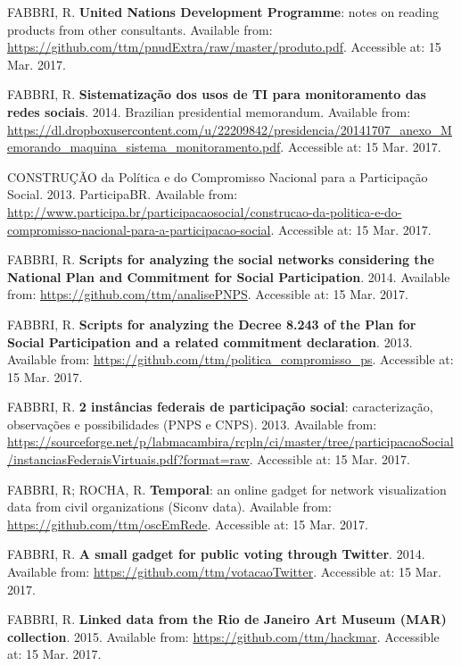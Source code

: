 \documentclass[
12pt,		%
openright,	%
twoside,  %
a4paper,			%
chapter=TITLE,		%
english,			%
french,				%
spanish,			%
brazil				%
]{USPSC}
\begin{document}
\begin{thebibliography}{999}
	FABBRI, R. \textbf{United Nations Development Programme}: notes on reading products from other consultants. Available from: \url{https://github.com/ttm/pnudExtra/raw/master/produto.pdf}. Accessible at: 15 Mar. 2017.

	FABBRI, R. \textbf{Sistematização dos usos de TI para monitoramento das redes sociais}. 2014. Brazilian presidential memorandum. Available from: \url{https://dl.dropboxusercontent.com/u/22209842/presidencia/20141707_anexo_Memorando_maquina_sistema_monitoramento.pdf}. Accessible at: 15 Mar. 2017.

	CONSTRUÇÃO da Política e do Compromisso Nacional para a Participação Social. 2013. ParticipaBR. Available from: \url{http://www.participa.br/participacaosocial/construcao-da-politica-e-do-compromisso-nacional-para-a-participacao-social}. Accessible at: 15 Mar. 2017.

	FABBRI, R. \textbf{Scripts for analyzing the social networks considering the National Plan and Commitment for Social Participation}. 2014. Available from: \url{https://github.com/ttm/analisePNPS}. Accessible at: 15 Mar. 2017.

	FABBRI, R. \textbf{Scripts for analyzing the Decree 8.243 of the Plan for Social Participation and a related commitment declaration}. 2013. Available from: \url{https://github.com/ttm/politica_compromisso_ps}. Accessible at: 15 Mar. 2017.

	FABBRI, R. \textbf{2 instâncias federais de participação social}: caracterização, observações e possibilidades (PNPS e CNPS). 2013. Available from: \url{https://sourceforge.net/p/labmacambira/rcpln/ci/master/tree/participacaoSocial/instanciasFederaisVirtuais.pdf?format=raw}. Accessible at: 15 Mar. 2017.

	FABBRI, R; ROCHA, R. \textbf{Temporal}: an online gadget for network visualization data from civil organizations (Siconv data). Available from: \url{https://github.com/ttm/oscEmRede}. Accessible at: 15 Mar. 2017.

	FABBRI, R. \textbf{A small gadget for public voting through Twitter}. 2014. Available from: \url{https://github.com/ttm/votacaoTwitter}. Accessible at: 15 Mar. 2017.

	FABBRI, R. \textbf{Linked data from the Rio de Janeiro Art Museum (MAR) collection}. 2015.  Available from: \url{https://github.com/ttm/hackmar}. Accessible at: 15 Mar. 2017.


\end{thebibliography}
\end{document}
